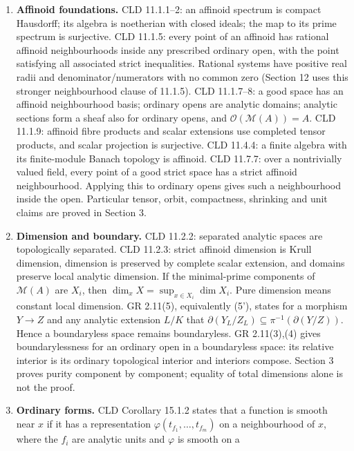 \documentclass[
  11pt,
]{article}
\begin{document}
\begin{enumerate}
\def\labelenumi{\arabic{enumi}.}
\item
  \textbf{Affinoid foundations.} CLD 11.1.1--2: an affinoid spectrum is
  compact Hausdorff; its algebra is noetherian with closed ideals; the
  map to its prime spectrum is surjective. CLD 11.1.5: every point of an
  affinoid has rational affinoid neighbourhoods inside any prescribed
  ordinary open, with the point satisfying all associated strict
  inequalities. Rational systems have positive real radii and
  denominator/numerators with no common zero (Section 12 uses this
  stronger neighbourhood clause of 11.1.5). CLD 11.1.7--8: a good space
  has an affinoid neighbourhood basis; ordinary opens are analytic
  domains; analytic sections form a sheaf also for ordinary opens, and
  \(\mathcal O(\mathcal M(A))=A\). CLD 11.1.9: affinoid fibre products
  and scalar extensions use completed tensor products, and scalar
  projection is surjective. CLD 11.4.4: a finite algebra with its
  finite-module Banach topology is affinoid. CLD 11.7.7: over a
  nontrivially valued field, every point of a good strict space has a
  strict affinoid neighbourhood. Applying this to ordinary opens gives
  such a neighbourhood inside the open. Particular tensor, orbit,
  compactness, shrinking and unit claims are proved in Section 3.
\item
  \textbf{Dimension and boundary.} CLD 11.2.2: separated analytic spaces
  are topologically separated. CLD 11.2.3: strict affinoid dimension is
  Krull dimension, dimension is preserved by complete scalar extension,
  and domains preserve local analytic dimension. If the minimal-prime
  components of \(\mathcal M(A)\) are \(X_i\), then
  \(\dim_xX=\sup_{x\in X_i}\dim X_i\). Pure dimension means constant
  local dimension. GR 2.11(5), equivalently (5'), states for a morphism
  \(Y\to Z\) and any analytic extension \(L/K\) that
  \(\partial(Y_L/Z_L)\subseteq\pi^{-1}(\partial(Y/Z))\). Hence a
  boundaryless space remains boundaryless. GR 2.11(3),(4) gives
  boundarylessness for an ordinary open in a boundaryless space: its
  relative interior is its ordinary topological interior and interiors
  compose. Section 3 proves purity component by component; equality of
  total dimensions alone is not the proof.
\item
  \textbf{Ordinary forms.} CLD Corollary 15.1.2 states that a function
  is smooth near \(x\) if it has a representation
  \(\varphi(t_{f_1},\ldots,t_{f_m})\) on a neighbourhood of \(x\), where
  the \(f_i\) are analytic units and \(\varphi\) is smooth on a

\end{enumerate}
\end{document}
